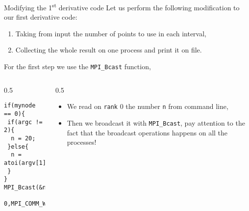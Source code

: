 \documentclass[xcolor={svgnames,usenames}]{beamer}
\begin{document}
\begin{frame}[fragile]{Modifying the 1\textsuperscript{st} derivative code}
	Let us perform the following modification to our first derivative code:
	\begin{enumerate}
		\item Taking from input the number of points to use in each interval,
		\item Collecting the whole result on one process and print it on file.
	\end{enumerate}
	\begin{onlyenv}
	For the first step we use the \texttt{MPI_Bcast} function,
	\begin{columns}
\begin{column}{0.5\columnwidth}
\begin{verbatim}
if(mynode == 0){
 if(argc != 2){
  n = 20;
 }else{
  n = atoi(argv[1]);
 }
}
MPI_Bcast(&n,1,MPI_INT,
 0,MPI_COMM_WORLD);
\end{verbatim}
\end{column}
\begin{column}{0.5\columnwidth}
\begin{itemize}
	\item We read on \texttt{rank} $0$ the number \texttt{n} from command line,
	\item Then we broadcast it with \texttt{MPI_Bcast}, pay attention to the fact that the broadcast operations happens on all the processes!
\end{itemize}
\end{column}
	\end{columns}
	\end{onlyenv}
\end{frame}
\end{document}
